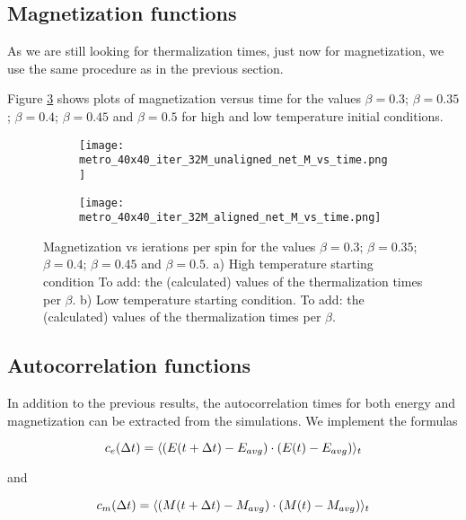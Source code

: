 \documentclass[11pt,a4paper]{article}
\DeclarePairedDelimiter{\avg}{\langle}{\rangle}
\begin{document}
\subsection{Magnetization functions}
As we are still looking for thermalization times, just now for magnetization, we use the same procedure as in
 the previous section. 

Figure \ref{fig:Mvt} shows plots of magnetization versus time for the values $\beta = 0.3$; $\beta = 0.35$;
 $\beta = 0.4$; $\beta = 0.45$ and $\beta = 0.5$ for high and low temperature initial conditions. 


\begin{figure}[h!]
\centering
\begin{subfigure}{.5\textwidth}
  \centering
  \texttt{[image: metro\_40x40\_iter\_32M\_unaligned\_net\_M\_vs\_time.png]}
  \caption{}
  \label{fig:Mvt_highT}
\end{subfigure}%
\begin{subfigure}{.5\textwidth}
  \centering
  \texttt{[image: metro\_40x40\_iter\_32M\_aligned\_net\_M\_vs\_time.png]}
  \caption{}
  \label{fig:Mvt_lowT}
\end{subfigure}
\caption{Magnetization vs ierations per spin for the values $\beta = 0.3$; $\beta = 0.35$;
         $\beta = 0.4$; $\beta = 0.45$ and $\beta = 0.5$. a) High temperature starting condition
         {\color{red}To add: the (calculated) values of the thermalization times per $\beta$}.
         b) Low temperature starting condition.
         {\color{red}To add: the (calculated) values of the thermalization times per $\beta$}.}
\label{fig:Mvt}
\end{figure}


\subsection{Autocorrelation functions}
In addition to the previous results, the autocorrelation times for both energy and magnetization can be
 extracted from the simulations. We implement the formulas

\begin{equation*}
    c_e(\Delta t) = \avg{(E(t+\Delta t) - E_{avg})\cdot (E(t)-E_{avg})}_t
\end{equation*}

and

\begin{equation*}
    c_m(\Delta t) = \avg{(M(t+\Delta t) - M_{avg})\cdot (M(t)-M_{avg})}_t
\end{equation*}
\end{document}
